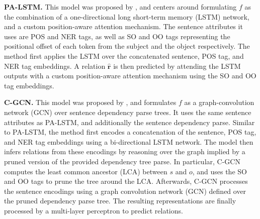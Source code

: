 \textbf{PA-LSTM.}
This model was proposed by \citet{palstm}, and centers around formulating $f$ as the combination of a one-directional long short-term memory (LSTM) network, and a custom position-aware attention mechanism.
The sentence attributes it uses are POS and NER tags, as well as SO and OO tags representing the positional offset of each token from the subject and the object respectively. The method first applies the LSTM over the concatenated sentence, POS tag, and NER tag embeddings. A relation $\hat{\bm{r}}$ is then predicted by attending the LSTM outputs with a custom position-aware attention mechanism using the SO and OO tag embeddings.

\textbf{C-GCN.}
This model was proposed by \citet{cgcn}, and formulates $f$ as a graph-convolution network (GCN) over sentence dependency parse trees. It uses the same sentence attributes as PA-LSTM, and additionally the sentence dependency parse.
Similar to PA-LSTM, the method first encodes a concatenation of the sentence, POS tag, and NER tag embeddings using a bi-directional LSTM network. The model then infers relations from these encodings by reasoning over the graph implied by a pruned version of the provided dependency tree parse.
In particular, C-GCN computes the least common ancestor (LCA) between $s$ and $o$, and uses the SO and OO tags to prune the tree around the LCA.
Afterwards, C-GCN processes the sentence encodings using a graph convolution network (GCN) defined over the pruned dependency parse tree.
The resulting representations are finally processed by a multi-layer perceptron to predict relations.

